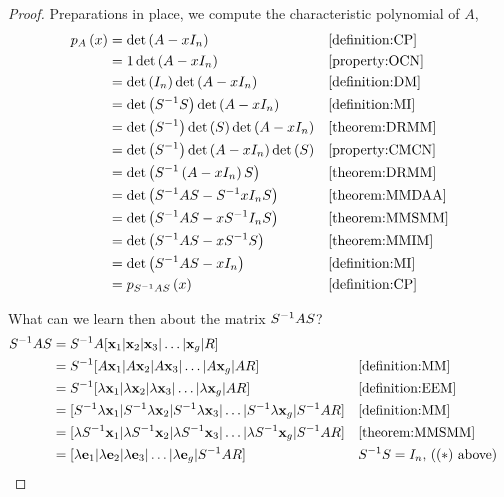 \documentclass{ximera}
\begin{document}
\begin{theorem}
\begin{proof}
Preparations in place, we compute the characteristic polynomial of $A$,
\begin{align*}
p_{A}\left(x\right)&=\det\left(A-xI_n\right)&&\ref{definition:CP}\\
&=1\det\left(A-xI_n\right)&&\ref{property:OCN}\\
&=\det\left(I_n\right)\det\left(A-xI_n\right)&&\ref{definition:DM}\\
&=\det\left(S^{-1}S\right)\det\left(A-xI_n\right)&&\ref{definition:MI}\\
&=\det\left(S^{-1}\right)\det\left(S\right)\det\left(A-xI_n\right)&&\ref{theorem:DRMM}\\
&=\det\left(S^{-1}\right)\det\left(A-xI_n\right)\det\left(S\right)&&\ref{property:CMCN}\\
&=\det\left(S^{-1}\left(A-xI_n\right)S\right)&&\ref{theorem:DRMM}\\
&=\det\left(S^{-1}AS-S^{-1}xI_nS\right)&&\ref{theorem:MMDAA}\\
&=\det\left(S^{-1}AS-xS^{-1}I_nS\right)&&\ref{theorem:MMSMM}\\
&=\det\left(S^{-1}AS-xS^{-1}S\right)&&\ref{theorem:MMIM}\\
&=\det\left(S^{-1}AS-xI_n\right)&&\ref{definition:MI}\\
&=p_{S^{-1}AS}\left(x\right)&&\ref{definition:CP}
\end{align*}




What can we learn then about the matrix $S^{-1}AS$?
\begin{align*}
S^{-1}AS&=S^{-1}A[\mathbf{x}_1|\mathbf{x}_2|\mathbf{x}_3|\ldots|\mathbf{x}_g|R]\\
&=S^{-1}[A\mathbf{x}_1|A\mathbf{x}_2|A\mathbf{x}_3|\ldots|A\mathbf{x}_g|AR]&&\ref{definition:MM}\\
&=S^{-1}[\lambda\mathbf{x}_1|\lambda\mathbf{x}_2|\lambda\mathbf{x}_3|\ldots|\lambda\mathbf{x}_g|AR]&&\ref{definition:EEM}\\
&=[S^{-1}\lambda\mathbf{x}_1|S^{-1}\lambda\mathbf{x}_2|S^{-1}\lambda\mathbf{x}_3|\ldots|S^{-1}\lambda\mathbf{x}_g|S^{-1}AR]&&\ref{definition:MM}\\
&=[\lambda S^{-1}\mathbf{x}_1|\lambda S^{-1}\mathbf{x}_2|\lambda S^{-1}\mathbf{x}_3|\ldots|\lambda S^{-1}\mathbf{x}_g|S^{-1}AR]&&\ref{theorem:MMSMM}\\
&=[\lambda\mathbf{e}_1|\lambda\mathbf{e}_2|\lambda\mathbf{e}_3|\ldots|\lambda\mathbf{e}_g|S^{-1}AR]&&\text{$S^{-1}S=I_n$, (($*$) above)}
\end{align*}





\end{proof}
\end{theorem}
\end{document}
